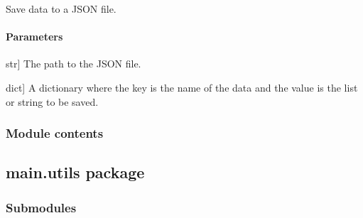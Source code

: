 \documentclass[letterpaper,10pt,english]{sphinxmanual}
\begin{document}

\begin{fulllineitems}
\label{\detokenize{main.transport_data:main.transport_data.transport_data.save_data_to_json}}
\pysigstartsignatures
{}
\pysigstopsignatures
\sphinxAtStartPar
Save data to a JSON file.


\paragraph{Parameters}
\label{\detokenize{main.transport_data:id4}}\begin{description}
\sphinxlineitem{file\_path}{[}str{]}
\sphinxAtStartPar
The path to the JSON file.

\sphinxlineitem{data\_dict}{[}dict{]}
\sphinxAtStartPar
A dictionary where the key is the name of the data and the value is the list or string to be saved.

\end{description}

\end{fulllineitems}



\subsubsection{Module contents}
\label{\detokenize{main.transport_data:module-main.transport_data}}\label{\detokenize{main.transport_data:module-contents}}
\sphinxstepscope


\subsection{main.utils package}
\label{\detokenize{main.utils:main-utils-package}}\label{\detokenize{main.utils::doc}}

\subsubsection{Submodules}
\label{\detokenize{main.utils:submodules}}
\end{document}
